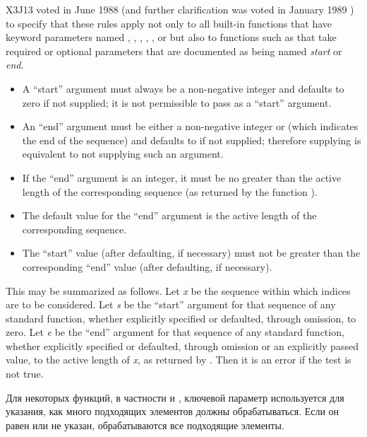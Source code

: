 \begin{newer}
X3J13 voted in June 1988 
(and further clarification was voted in January 1989
)
to specify that these rules apply not
only to all built-in functions that have keyword parameters named
, , , , ,
or  but also to functions such as 
that take required or optional parameters that are documented
as being named \emph{start} or \emph{end}.
\begin{itemize}
\item A ``start'' argument must always be a non-negative integer and
defaults to zero if not supplied; it is not permissible to pass 
as a ``start'' argument.
\item An ``end'' argument must be either a
non-negative integer or  (which indicates the end of the
sequence) and defaults to 
if not supplied; therefore supplying  is equivalent to
not supplying such an argument.
\item If the ``end'' argument is an integer, it must be no greater than the
active length of the corresponding sequence
(as returned by the function ).
\item The default value for the ``end'' argument is the active length
of the corresponding sequence.
\item The ``start'' value (after defaulting, if necessary) must not be greater than the
corresponding ``end'' value (after defaulting, if necessary).
\end{itemize}
This may be summarized as follows.
Let \emph{x} be the sequence within which indices are to be considered.  Let \emph{s} be
the ``start'' argument for that sequence of any standard function,
whether explicitly specified or defaulted, through omission, to
zero.  Let \emph{e} be the ``end'' argument for that sequence
of any standard function, whether explicitly specified or defaulted, through
omission or an explicitly passed  value, to the active length of \emph{x}, as
returned by .  Then it is an error if the test
is not true.
\end{newer}

Для некоторых функций, в частности  и , ключевой
параметр  используется для указания, как много подходящих элементов
должны обрабатываться. Если он равен {\false} или не указан, обрабатываются все
подходящие элементы.

